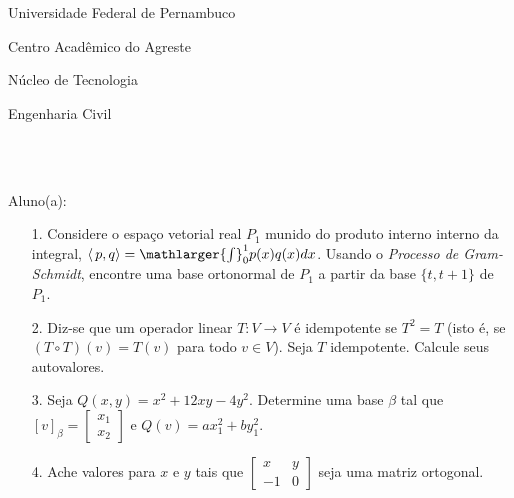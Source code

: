 \documentclass[oneside,a4paper,12pt]{article}
\newcommand{\universidade}{Universidade Federal de Pernambuco}
\newcommand{\centro}{Centro Acadêmico do Agreste}
\newcommand{\departamento}{Núcleo de Tecnologia}
\newcommand{\curso}{Engenharia Civil}
\begin{document}
	\pagestyle{empty}
	
	\begin{center}
	 	\vspace{0pt}
	 	
		\universidade
		\par
		\centro
		\par
		\departamento
		\par
		\curso
		\par
		\vspace{08pt}
		\\
		 \\
	\end{center}
	
	
	\begin{flushleft}
		Aluno(a):
	\end{flushleft}
	
\begin{itemize}
\item[1.] Considere o espaço vetorial real $P_{1}$ munido do produto interno interno da integral, $\langle\,p,q\rangle=\mathlarger{\int}_{0}^{1}p(x)q(x)dx$. Usando o \textit{Processo de Gram-Schmidt}, encontre uma base ortonormal de $P_{1}$ a partir da base $\{t,t+1\}$ de $P_{1}$.
\end{itemize}
\begin{itemize}
\item[2.] Diz-se que um operador linear $T:V\longrightarrow V$ é idempotente se $T^{2}=T$ (isto é, se $(T\circ T)(v)=T(v)$ para todo $v\in V$). Seja $T$ idempotente. Calcule seus autovalores.
 \end{itemize}
 \begin{itemize}
\item [3.] Seja $Q(x,y)=x^{2}+12xy-4y^{2}$. Determine uma base $\beta$ tal que $[v]_{\beta}=\begin{bmatrix}
x_{1} \\
x_{2}
\end{bmatrix}$ e $Q(v)=ax_{1}^{2}+by_{1}^{2}$.
\end{itemize}
\begin{itemize}
\item[4.]Ache valores para $x$ e $y$ tais que $\left[\begin{array}{rr}
x&y\\
-1&0
\end{array}\right]$ seja uma matriz ortogonal.
\end{itemize}
\end{document}

